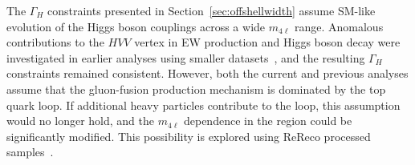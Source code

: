 

The $\Gamma_H$ constraints presented in Section~\ref{sec:offshellwidth} assume SM-like evolution of the Higgs boson couplings across a wide $m_{4\ell}$ range. Anomalous contributions to the $HVV$ vertex in EW production and Higgs boson decay were investigated in earlier analyses using smaller datasets~\cite{Sirunyan:2019twz,CMS:2022ley}, and the resulting $\Gamma_H$ constraints remained consistent. However, both the current and previous analyses assume that the gluon-fusion production mechanism is dominated by the top quark loop. If additional heavy particles contribute to the loop, this assumption would no longer hold, and the $m_{4\ell}$ dependence in the \offshell region could be significantly modified. This possibility is explored using ReReco processed samples~\cite{PhysRevD.111.092014}.

